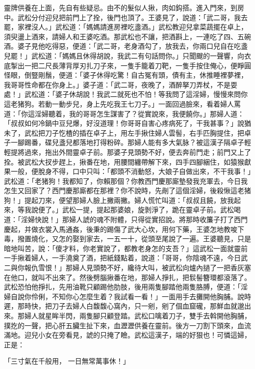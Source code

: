\begin{showcontents}{}
靈牌供養在上面，先自有些疑忌。由不的髮似人揪，肉如鈎搭。進入門來，到房中。武松分付迎兒把前門上了拴，後門也頂了。王婆見了，說道：「武二哥，我去罷，家裡沒人。」武松道：「媽媽請進房裡吃盞酒。」武松教迎兒拿菜蔬擺在卓上，須臾盪上酒來，請婦人和王婆吃酒。那武松也不讓，把酒斟上，一連吃了四、五碗酒。婆子見他吃得惡，便道：「武二哥，老身酒勾了，放我去，你兩口兒自在吃盞兒罷！」武松道：「媽媽且休得胡說，我武二有句話問你。」只聞颼的一聲響，向衣底掣出一把二尺長薄背厚刃扎刀子來，一隻手籠着刀靶，一隻手按住俺心，便睜圓怪眼，倒豎剛鬚，便道：「婆子休得吃驚！自古冤有頭，債有主，休推睡裡夢裡，我哥哥性命都在你身上。」婆子道：「武二哥，夜晚了，酒醉拏刀弄杖，不是耍處！」武松道：「婆子休胡說！我武二就死也不怕！等我問了這淫婦，慢慢來問你這老猪狗。若動一動步兒，身上先吃我王七刀子。」一面回過臉來，看着婦人罵道：「你這淫婦聽着，我的哥哥怎生謀害了？從實說來，我便饒你。」那婦人道：「叔叔如何冷鍋中豆兒爆，好沒道理！你哥哥自害心疼病死了，干我甚事？」說猶未了，武松把刀子忔楂的插在卓子上，用左手揪住婦人雲髻，右手匹胸提住，把卓子一腳踢番，碟兒盞兒都落地打得粉碎。那婦人能有多大氣脉？被這漢子隔卓子輕輕提將過來，拖出外間靈卓子前。那婆子見頭勢不好，便去奔前門走；前門又上了拴。被武松大扠步趕上，揪番在地，用腰間纏帶解下來，四手四腳綑住，如猿猴獻果一般，便脫身不得，口中只叫：「都頭不消動怒，大娘子自做出來，不干我事！」武松道：「老猪狗！我都知了，你賴那個？你教西門慶那廝墊發我充軍去，今日我怎生又回家了？西門慶那廝都在那裡？你不說時，先剮了這個淫婦，後殺愀這老猪狗！」提起刀來，便望那婦人臉上撇兩撇。婦人慌忙叫道：「叔叔且饒，放我起來，等我說便了。」武松一提，提起那婆娘，旋剝淨了，跪在靈卓子前。武松喝道：「淫婦快說！」那婦人諕的魂不附體，只得從實招說。將那時收簾子打了西門慶起，并做衣裳入馬通姦，後秉的踢傷了武大心坎，用何下藥，王婆怎地教唆下毒，撥置燒化，又怎的娶到家去，一五一十，從頭至尾說了一遍。王婆聽見，只是暗地叫苦，說：「傻才料，你老實說了，都教老身怎的支吾？」這武松一面就靈前一手揪着婦人，一手澆奠了酒，把紙錢點着，說道：「哥哥，你陰魂不遠，今日武二與你報仇雪恨！」那婦人見頭勢不好，纔待大叫，被武松向爐內撾了一把香灰塞在他口，就叫不出來了。然後劈腦揪番在地，那婦人掙扎，把䯼髻簪環都滾落了。武松恐怕他掙扎，先用油靴只顧踢他肋肢，後用兩隻腳踏他兩隻胳膊，便道：「淫婦自說你伶俐，不知你心怎麼生着？我試看一看！」一面用手去攤開他胸脯。說時遲，那時快，把刀子去婦人白馥馥心窩內，只一剜，剜了個血窟礲，那鮮血就邈出來。那婦人就星眸半閃，兩隻腳只顧登踏。武松口噙着刀子，雙手去斡開他胸脯，撲扢的一聲，把心肝五臟生扯下來，血瀝瀝供養在靈前。後方一刀割下頭來，血流滿地。迎兒小女在旁看見，諕的只掩了瞼。武松這漢子，端的好狠也！可憐這婦，正是：

「三寸氣在千般用，  一日無常萬事休！」


\end{showcontents}
